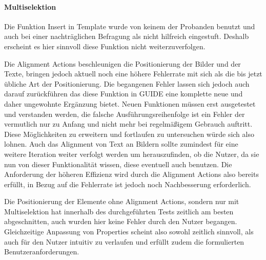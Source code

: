 \paragraph{Multiselektion}
Die Funktion \glqq Insert in Template\grqq{} wurde von keinem der Probanden benutzt und auch bei einer nachträglichen Befragung als nicht hilfreich eingestuft.
Deshalb erscheint es hier sinnvoll diese Funktion nicht weiterzuverfolgen.

Die Alignment Actions beschleunigen die Positionierung der Bilder und der Texte, bringen jedoch aktuell noch eine höhere Fehlerrate mit sich als die bis jetzt übliche Art der Positionierung.
Die begangenen Fehler lassen sich jedoch auch darauf zurückführen das diese Funktion in GUIDE eine komplette neue und daher ungewohnte Ergänzung bietet.
Neuen Funktionen müssen erst ausgetestet und verstanden werden, die falsche Ausführungsreihenfolge ist ein Fehler der vermutlich nur zu Anfang und nicht mehr bei regelmäßigem Gebrauch auftritt.
Diese Möglichkeiten zu erweitern und fortlaufen zu untersuchen würde sich also lohnen.
Auch das Alignment von Text an Bildern sollte zumindest für eine weitere Iteration weiter verfolgt werden um herauszufinden, ob die Nutzer, da sie nun von dieser Funktionalität wissen, diese eventuell auch benutzen.
Die Anforderung der höheren Effizienz wird durch die Alignment Actions also bereits erfüllt, in Bezug auf die Fehlerrate ist jedoch noch Nachbesserung erforderlich.

Die Positionierung der Elemente ohne Alignment Actions, sondern nur mit Multiselektion hat innerhalb des durchgeführten Tests zeitlich am besten abgeschnitten, auch wurden hier keine Fehler durch den Nutzer begangen.
Gleichzeitige Anpassung von Properties scheint also sowohl zeitlich sinnvoll, als auch für den Nutzer intuitiv zu verlaufen und erfüllt zudem die formulierten Benutzeranforderungen.

